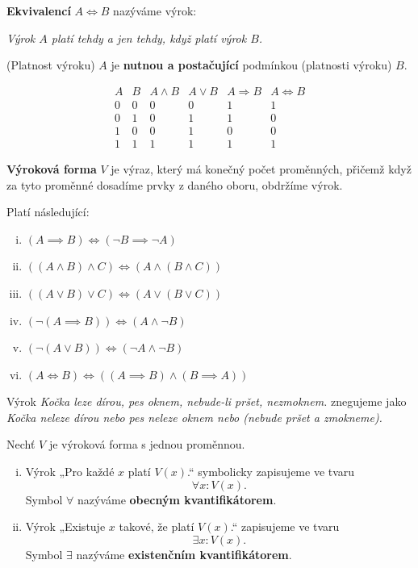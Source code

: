 \begin{definice}
\textbf{Ekvivalencí} $A \iff B$ nazýváme výrok:

\begin{center}
	\emph{Výrok $A$ platí tehdy a jen tehdy, když platí výrok $B$.}
\end{center}

(Platnost výroku) $A$ je \textbf{nutnou a postačující} podmínkou (platnosti výroku) $B$.

\[
\begin{array}{c|c|c|c|c|c}
A & B & A\wedge B & A\vee B & A\Rightarrow B & A\Leftrightarrow B \\
\hline
0 & 0 & 0 & 0 & 1 & 1 \\
0 & 1 & 0 & 1 & 1 & 0 \\
1 & 0 & 0 & 1 & 0 & 0 \\
1 & 1 & 1 & 1 & 1 & 1
\end{array}
\]

\textbf{Výroková forma} $V$ je výraz, který má konečný počet proměnných, přičemž když za tyto proměnné dosadíme prvky z daného oboru, obdržíme výrok.
\end{definice}

\begin{poznamka}
	Platí následující:
	\begin{enumerate}[(i)]
		\item $(A\implies B)\iff (\neg B\implies \neg A)$
		\item $((A\land B)\land C)\iff (A\land (B\land C))$
		\item $((A\lor B)\lor C) \iff (A\lor (B\lor C))$
		\item $(\neg (A\implies B))\iff (A\land \neg B)$
		\item $(\neg (A\lor B))\iff (\neg A\land \neg B)$
		\item $(A\iff B)\iff ((A\implies B)\land (B\implies A))$
	\end{enumerate}
\end{poznamka}

\begin{priklad}
	Výrok \textit{Kočka leze dírou, pes oknem, nebude-li pršet, nezmoknem.} znegujeme jako \textit{Kočka neleze dírou nebo pes neleze oknem nebo (nebude pršet a zmokneme).}
\end{priklad}

\begin{definice}
Nechť $V$ je výroková forma s jednou proměnnou.
\begin{enumerate}[(i)]
\item Výrok „Pro každé $x$ platí $V(x)$.“ symbolicky zapisujeme ve tvaru
\[
\forall x : V(x).
\]
Symbol $\forall$ nazýváme \textbf{obecným kvantifikátorem}.
\item Výrok „Existuje $x$ takové, že platí $V(x)$.“ zapisujeme ve tvaru
\[
\exists x : V(x).
\]
Symbol $\exists$ nazýváme \textbf{existenčním kvantifikátorem}.
\end{enumerate}
\end{definice}

